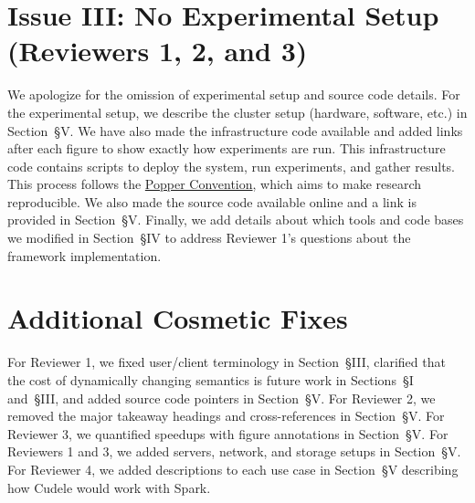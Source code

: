 \documentclass[onecolumn,conference]{IEEEtran}
\begin{document}
\section*{Issue III: No Experimental Setup (Reviewers 1, 2, and 3)}

We apologize for the omission of experimental setup and source code details.
For the experimental setup, we describe the cluster setup (hardware, software,
etc.) in Section~{\S}V.  We have also made the infrastructure code available
and added links after each figure to show exactly how experiments are run.
This infrastructure code contains scripts to deploy the system, run
experiments, and gather results.  This process follows the
\href{http://falsifiable.us/}{Popper Convention}, which aims to make research
reproducible.  We also made the source code available online and a link is
provided in Section~{\S}V. Finally, we add details about which tools and
code bases we modified in Section~{\S}IV to address Reviewer 1's questions about
the framework implementation.

\section*{Additional Cosmetic Fixes}

For Reviewer 1, we fixed user/client terminology in Section~{\S}III,
clarified that the cost of dynamically changing semantics is future work in
Sections~{\S}I and~{\S}III, and added source code pointers in Section~{\S}V.
For Reviewer 2, we removed the major takeaway headings and cross-references in
Section~{\S}V. For Reviewer 3, we quantified speedups with figure annotations
in Section~{\S}V. For Reviewers 1 and 3, we added servers, network, and storage
setups in Section~{\S}V. For Reviewer 4, we added descriptions to each use case
in Section~{\S}V describing how Cudele would work with Spark. 
\end{document}
